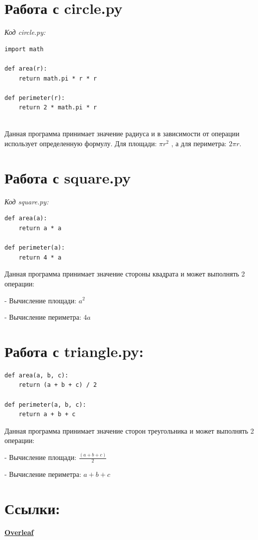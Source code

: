 \documentclass[a4paper,30pt]{article}
\begin{document}
\section*{Работа с circle.py }

\textit{Код circle.py:}
\begin{lstlisting}
import math

def area(r):
    return math.pi * r * r

def perimeter(r):
    return 2 * math.pi * r


\end{lstlisting}

Данная программа принимает значение радиуса и в зависимости от операции использует определенную формулу. 
Для площади: $\pi r^2$ , а для периметра: $2\pi r$.

\section*{Работа с square.py}
\textit{Код square.py:}
\begin{lstlisting}
def area(a):
    return a * a

def perimeter(a):
    return 4 * a
\end{lstlisting}

Данная программа принимает значение стороны квадрата и может выполнять 2 операции:

- Вычисление площади: $a^2$

- Вычисление периметра: $4a$

\section*{Работа с triangle.py:}
\begin{lstlisting}
def area(a, b, c):
    return (a + b + c) / 2

def perimeter(a, b, c):
    return a + b + c
\end{lstlisting}
Данная программа принимает значение сторон треугольника и может выполнять 2 операции:

- Вычисление площади: $\frac{(a+b+c)}{2}$

- Вычисление периметра: $a+b+c$
\section*{Ссылки:}
\href{https://www.overleaf.com/read/vdhgsbtmrgzw#f688ed}{\textbf{Overleaf}}
\end{document}
